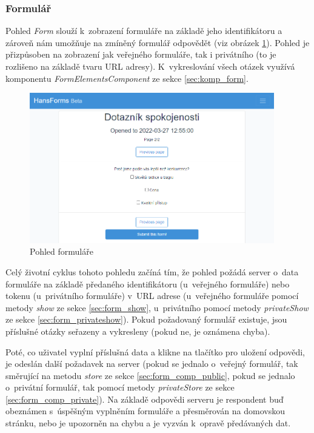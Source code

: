 		\subsubsection{Formulář} %
		Pohled \textit{Form} slouží k~zobrazení formuláře na základě jeho identifikátoru a zároveň nám umožňuje na zmíněný formulář odpovědět (viz obrázek \ref{fig:pohled_form}). Pohled je přizpůsoben na zobrazení jak veřejného formuláře, tak i privátního (to je rozlišeno na základě tvaru URL adresy). K~vykreslování všech otázek využívá komponentu \textit{FormElementsComponent} ze sekce \ref{sec:komp_form}.
		
		\begin{figure}[h]
			\centering
			\includegraphics[width=0.95\textwidth]{img/pohledy/form.png}
			\caption{Pohled formuláře}
			\label{fig:pohled_form}
		\end{figure}
		
		Celý životní cyklus tohoto pohledu začíná tím, že pohled požádá server o~data formuláře na základě předaného identifikátoru (u~veřejného formuláře) nebo tokenu (u~privátního formuláře) v~URL adrese (u~veřejného formuláře pomocí metody \textit{show} ze sekce \ref{sec:form_show}, u~privátního pomocí metody \textit{privateShow} ze sekce \ref{sec:form_privateshow}). Pokud požadovaný formulář existuje, jsou příslušné otázky seřazeny a vykresleny (pokud ne, je oznámena chyba).
		
		Poté, co uživatel vyplní příslušná data a klikne na tlačítko pro uložení odpovědi, je odeslán další požadavek na server (pokud se jednalo o~veřejný formulář, tak směrující na metodu \textit{store} ze sekce \ref{sec:form_comp_public}, pokud se jednalo o~privátní formulář, tak pomocí metody \textit{privateStore} ze sekce \ref{sec:form_comp_private}). Na základě odpovědi serveru je respondent buď obeznámen s~úspěšným vyplněním formuláře a přesměrován na domovskou stránku, nebo je upozorněn na chybu a je vyzván k~opravě předávaných dat.
		
